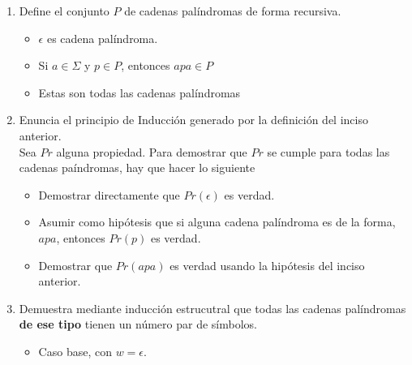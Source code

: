 \documentclass{article}
\begin{document}
\begin{enumerate}
{            \begin{enumerate}
                \item {
                    Define el conjunto $P$ de cadenas palíndromas de forma 
                    recursiva.
                    \begin{itemize}
                        \item {
                            $\epsilon$ es cadena palíndroma.
                        }
                        \item {
                            Si $a \in \Sigma$ y $p \in P$, entonces $apa \in P$
                        }
                        \item {
                            Estas son todas las cadenas palíndromas 
                        }
                    \end{itemize}
                }
                \item {
                    Enuncia el principio de Inducción generado por la definición
                    del inciso anterior.\\
                    Sea $Pr$ alguna propiedad. Para demostrar que $Pr$ se cumple
                    para todas las cadenas paíndromas, hay que hacer lo siguiente
                    \begin{itemize}
                        \item {
                            Demostrar directamente que $Pr(\epsilon)$ es verdad.
                        }
                        \item {
                            Asumir como hipótesis que si alguna cadena 
                            palíndroma es de la forma, $apa$, entonces $Pr(p)$ es verdad.
                        }
                        \item {
                            Demostrar que $Pr(apa)$ es verdad usando la 
                            hipótesis del inciso anterior.
                        }
                    \end{itemize}
                }
                \item {
                    Demuestra mediante inducción estrucutral que todas las 
                    cadenas palíndromas \textbf{de ese tipo} tienen un número 
                    par de símbolos.
                    \begin{itemize}
                        \item {
                            Caso base, con $w = \epsilon$.\\
}
\end{itemize}}
\end{enumerate}}
\end{enumerate}
\end{document}
